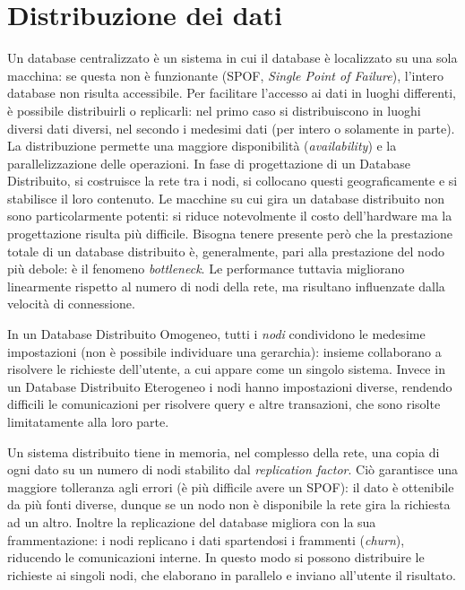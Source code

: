 \documentclass[a4page, 11pt]{article}
\begin{document}
\part{Distribuzione dei dati}
Un database centralizzato è un sistema in cui il database è localizzato su una sola macchina: se questa non è funzionante (SPOF, \textit{Single Point of Failure}), l'intero database non risulta accessibile.
Per facilitare l'accesso ai dati in luoghi differenti, è possibile distribuirli o replicarli: nel primo caso si distribuiscono in luoghi diversi dati diversi, nel secondo i medesimi dati (per intero o solamente in parte).
La distribuzione permette una maggiore disponibilità (\textit{availability}) e la parallelizzazione delle operazioni.
In fase di progettazione di un Database Distribuito, si costruisce la rete tra i nodi, si collocano questi geograficamente e si stabilisce il loro contenuto.
Le macchine su cui gira un database distribuito non sono particolarmente potenti: si riduce notevolmente il costo dell'hardware ma la progettazione risulta più difficile.
Bisogna tenere presente però che la prestazione totale di un database distribuito è, generalmente, pari alla prestazione del nodo più debole: è il fenomeno \textit{bottleneck}.
Le performance tuttavia migliorano linearmente rispetto al numero di nodi della rete, ma risultano influenzate dalla velocità di connessione.

In un Database Distribuito Omogeneo, tutti i \textit{nodi} condividono le medesime impostazioni (non è possibile individuare una gerarchia): insieme collaborano a risolvere le richieste dell'utente, a cui appare come un singolo sistema.
Invece in un Database Distribuito Eterogeneo i nodi hanno impostazioni diverse, rendendo difficili le comunicazioni per risolvere query e altre transazioni, che sono risolte limitatamente alla loro parte.

Un sistema distribuito tiene in memoria, nel complesso della rete, una copia di ogni dato su un numero di nodi stabilito dal \textit{replication factor}.
Ciò garantisce una maggiore tolleranza agli errori (è più difficile avere un SPOF): il dato è ottenibile da più fonti diverse, dunque se un nodo non è disponibile la rete gira la richiesta ad un altro.
Inoltre la replicazione del database migliora con la sua frammentazione: i nodi replicano i dati spartendosi i frammenti (\textit{churn}), riducendo le comunicazioni interne.
In questo modo si possono distribuire le richieste ai singoli nodi, che elaborano in parallelo e inviano all'utente il risultato.
\end{document}
